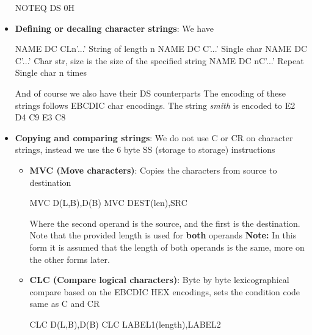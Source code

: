 \documentclass{report}
\begin{document}
\begin{itemize}
\begin{cppcode}
                    NOTEQ   DS      0H
                    \end{cppcode}
                \item \textbf{Defining or decaling character strings}: We have
                    \bigbreak \noindent 
                    \begin{cppcode}
                    NAME        DC      CLn'...'   String of length n
                    NAME        DC      C'...'     Single char
                    NAME        DC      C'...'     Char str, size is the size of the specified string
                    NAME        DC      nC'...'    Repeat Single char n times
                    \end{cppcode}
                    \bigbreak \noindent 
                    And of course we also have their DS counterparts
                    \bigbreak \noindent 
                    The encoding of these strings follows EBCDIC char encodings. The string \textit{smith} is encoded to E2 D4 C9 E3 C8
                \item \textbf{Copying and comparing strings}: We do not use C or CR on character strings, instead we use the 6 byte SS (storage to storage) instructions
                    \begin{itemize}
                        \item \textbf{MVC (Move characters)}: Copies the characters from source to destination
                            \bigbreak \noindent 
                            \begin{cppcode}
                            MVC     D(L,B),D(B)
                            MVC     DEST(len),SRC
                            \end{cppcode}
                            \bigbreak \noindent 
                            Where the second operand is the source, and the first is the destination. Note that the provided length is used for \textbf{both} operands
                            \bigbreak \noindent 
                            \textbf{Note:} In this form it is assumed that the length of both operands is the same, more on the other forms later.
                        \item \textbf{CLC (Compare logical characters)}: Byte by byte lexicographical compare based on the EBCDIC HEX encodings, sets the condition code same as C and CR
                            \bigbreak \noindent 
                            \begin{cppcode}
                            CLC     D(L,B),D(B)
                            CLC     LABEL1(length),LABEL2

\end{cppcode}
\end{itemize}
\end{itemize}
\end{document}
